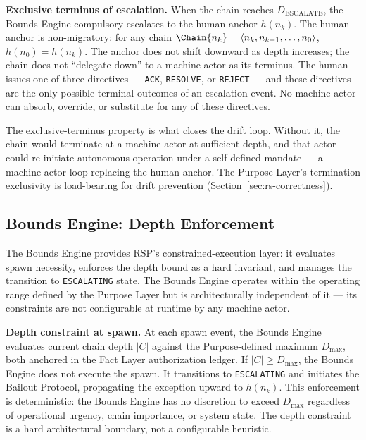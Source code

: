 \medskip
\noindent\textbf{Exclusive terminus of escalation.} When the chain reaches $D_{\mathrm{ESCALATE}}$, the Bounds Engine compulsory-escalates to the human anchor $h(n_k)$. The human anchor is non-migratory: for any chain $\Chain{n_k} = \langle n_k, n_{k-1}, \ldots, n_0 \rangle$, $h(n_0) = h(n_k)$. The anchor does not shift downward as depth increases; the chain does not ``delegate down'' to a machine actor as its terminus. The human issues one of three directives --- \texttt{ACK}, \texttt{RESOLVE}, or \texttt{REJECT} --- and these directives are the only possible terminal outcomes of an escalation event. No machine actor can absorb, override, or substitute for any of these directives.

The exclusive-terminus property is what closes the drift loop. Without it, the chain would terminate at a machine actor at sufficient depth, and that actor could re-initiate autonomous operation under a self-defined mandate --- a machine-actor loop replacing the human anchor. The Purpose Layer's termination exclusivity is load-bearing for drift prevention (Section~\ref{sec:rs-correctness}).

\subsection{Bounds Engine: Depth Enforcement}
\label{sec:rs-bounds-depth}

The Bounds Engine provides RSP's constrained-execution layer: it evaluates spawn necessity, enforces the depth bound as a hard invariant, and manages the transition to \texttt{ESCALATING} state. The Bounds Engine operates within the operating range defined by the Purpose Layer but is architecturally independent of it --- its constraints are not configurable at runtime by any machine actor.

\medskip
\noindent\textbf{Depth constraint at spawn.} At each spawn event, the Bounds Engine evaluates current chain depth $|C|$ against the Purpose-defined maximum $D_{\max}$, both anchored in the Fact Layer authorization ledger. If $|C| \geq D_{\max}$, the Bounds Engine does not execute the spawn. It transitions to \texttt{ESCALATING} and initiates the Bailout Protocol, propagating the exception upward to $h(n_k)$. This enforcement is deterministic: the Bounds Engine has no discretion to exceed $D_{\max}$ regardless of operational urgency, chain importance, or system state. The depth constraint is a hard architectural boundary, not a configurable heuristic.

